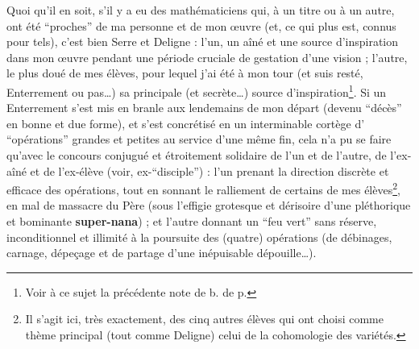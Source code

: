Quoi qu'il en soit, s'il y a eu des mathématiciens qui, à un titre ou à un autre, ont été ``proches'' de ma personne et de mon œuvre (et, ce qui plus est, connus pour tels), c'est bien Serre et Deligne : l'un, un aîné et une source d'inspiration dans mon œuvre pendant une période cruciale de gestation d'une vision ; l'autre, le plus doué de mes élèves, pour lequel j'ai été à mon tour (et suis resté, Enterrement ou pas\ldots) sa principale (et secrète\ldots) source d'inspiration\footnote{Voir à ce sujet la précédente note de b. de p.}. Si un Enterrement s'est mis en branle aux lendemains de mon départ (devenu ``décès'' en bonne et due forme), et s'est concrétisé en un interminable cortège d' ``opérations'' grandes et petites au service d'une même fin, cela n'a pu se faire qu'avec le concours conjugué et étroitement solidaire de l'un et de l'autre, de l'ex-aîné et de l'ex-élève (voir, ex-``disciple'') : l'un prenant la direction discrète et efficace des opérations, tout en sonnant le ralliement de certains de mes élèves\footnote{Il s'agit ici, très exactement, des cinq autres élèves qui ont choisi comme thème principal (tout comme Deligne) celui de la cohomologie des variétés.}, en mal de massacre du Père (sous l'effigie grotesque et dérisoire d'une pléthorique et bominante \textbf{super-nana}) ; et l'autre donnant un ``feu vert'' sans réserve, inconditionnel et illimité à la poursuite des (quatre) opérations (de débinages, carnage, dépeçage et de partage d'une inépuisable dépouille\ldots).

